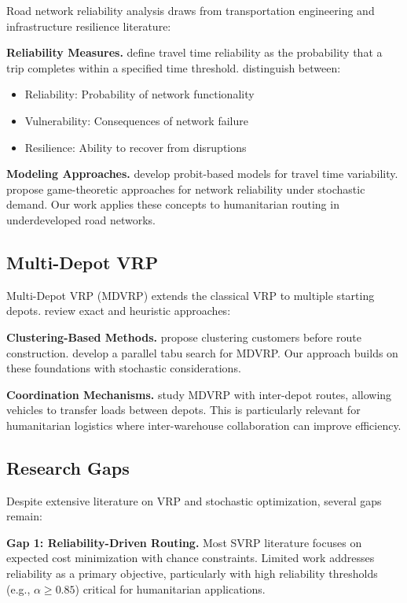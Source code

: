 Road network reliability analysis draws from transportation engineering and infrastructure resilience literature:

\textbf{Reliability Measures.} \cite{Bell2000} define travel time reliability as the probability that a trip completes within a specified time threshold. \cite{Nicholson2006} distinguish between:
\begin{itemize}
\item Reliability: Probability of network functionality
\item Vulnerability: Consequences of network failure
\item Resilience: Ability to recover from disruptions
\end{itemize}

\textbf{Modeling Approaches.} \cite{Taylor2000} develop probit-based models for travel time variability. \cite{Lo2006} propose game-theoretic approaches for network reliability under stochastic demand. Our work applies these concepts to humanitarian routing in underdeveloped road networks.

\subsection{Multi-Depot VRP}

Multi-Depot VRP (MDVRP) extends the classical VRP to multiple starting depots. \cite{Polacek2008} review exact and heuristic approaches:

\textbf{Clustering-Based Methods.} \cite{Gillett1974} propose clustering customers before route construction. \cite{Cordeau1997} develop a parallel tabu search for MDVRP. Our approach builds on these foundations with stochastic considerations.

\textbf{Coordination Mechanisms.} \cite{Crevier2007} study MDVRP with inter-depot routes, allowing vehicles to transfer loads between depots. This is particularly relevant for humanitarian logistics where inter-warehouse collaboration can improve efficiency.

\subsection{Research Gaps}

Despite extensive literature on VRP and stochastic optimization, several gaps remain:

\textbf{Gap 1: Reliability-Driven Routing.} Most SVRP literature focuses on expected cost minimization with chance constraints. Limited work addresses reliability as a primary objective, particularly with high reliability thresholds (e.g., $\alpha \geq 0.85$) critical for humanitarian applications.

